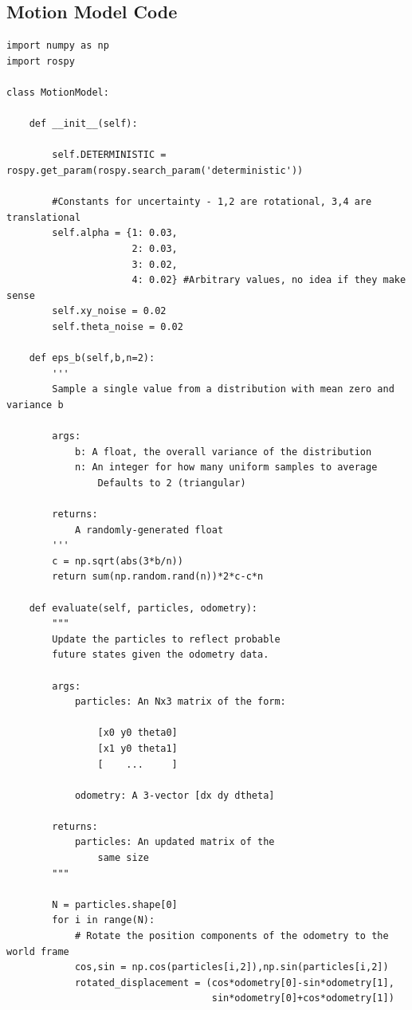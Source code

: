 \documentclass{article}
\begin{document}
\subsection{Motion Model Code}
{\footnotesize
\begin{verbatim}
import numpy as np
import rospy

class MotionModel:

    def __init__(self):
    
        self.DETERMINISTIC = rospy.get_param(rospy.search_param('deterministic'))

        #Constants for uncertainty - 1,2 are rotational, 3,4 are translational
        self.alpha = {1: 0.03,
                      2: 0.03,
                      3: 0.02,
                      4: 0.02} #Arbitrary values, no idea if they make sense
        self.xy_noise = 0.02
        self.theta_noise = 0.02

    def eps_b(self,b,n=2):
        '''
        Sample a single value from a distribution with mean zero and variance b
        
        args:
            b: A float, the overall variance of the distribution
            n: An integer for how many uniform samples to average
                Defaults to 2 (triangular)
        
        returns:
            A randomly-generated float
        '''
        c = np.sqrt(abs(3*b/n))
        return sum(np.random.rand(n))*2*c-c*n

    def evaluate(self, particles, odometry):
        """
        Update the particles to reflect probable
        future states given the odometry data.

        args:
            particles: An Nx3 matrix of the form:
            
                [x0 y0 theta0]
                [x1 y0 theta1]
                [    ...     ]

            odometry: A 3-vector [dx dy dtheta]

        returns:
            particles: An updated matrix of the
                same size
        """
        
        N = particles.shape[0]
        for i in range(N):
            # Rotate the position components of the odometry to the world frame
            cos,sin = np.cos(particles[i,2]),np.sin(particles[i,2])
            rotated_displacement = (cos*odometry[0]-sin*odometry[1],
                                    sin*odometry[0]+cos*odometry[1])
            

\end{verbatim}}
\end{document}
